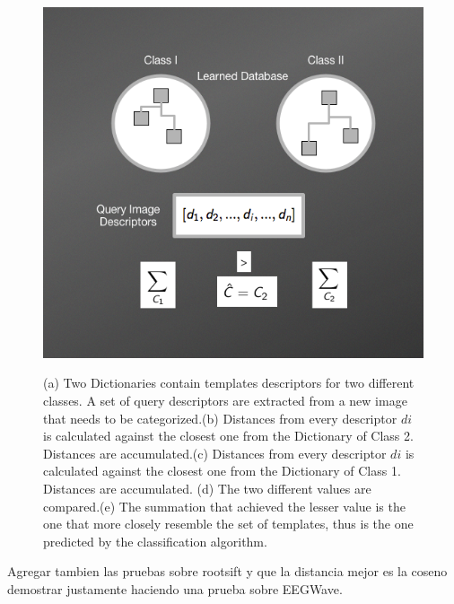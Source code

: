 \begin{figure}[h!]
{\includegraphics[scale=0.25]{images/NBNNMethod5.png}}
\caption[NBNN Classification]{(a) Two Dictionaries contain templates descriptors for two different classes. A set of query descriptors are extracted from a new image that needs to be categorized.(b) Distances from every descriptor $di$ is calculated against the closest one from the Dictionary of Class 2.  Distances are accumulated.(c) Distances from every descriptor $di$ is calculated against the closest one from the Dictionary of Class 1.  Distances are accumulated. (d) The two different values are compared.(e) The summation that achieved the lesser value is the one that more closely resemble the set of templates, thus is the one predicted by the classification algorithm.}
\label{fig:nbnnclassification}
\end{figure}



Agregar tambien las pruebas sobre rootsift y que la distancia mejor es la coseno demostrar justamente haciendo una prueba sobre EEGWave.
